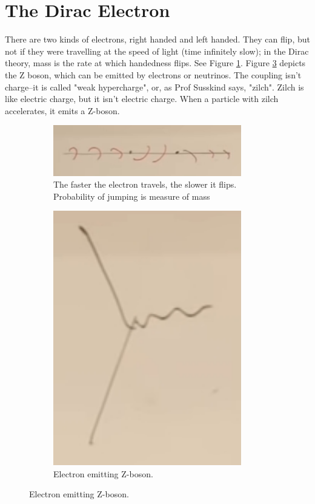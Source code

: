 \documentclass[]{article}
\begin{document}
\section{The Dirac Electron}

There are two kinds of electrons, right handed and left handed. They can flip, but not if they were travelling at the speed of light (time infinitely slow); in the Dirac theory, mass is the rate at which handedness flips. See Figure \ref{fig:2-a3-flipping-electron}. Figure \ref{fig:2-a3-Z-boson} depicts the Z boson, which can be emitted by electrons or neutrinos. The coupling isn't charge--it is called "weak hypercharge", or, as Prof Susskind says, "zilch". Zilch is like electric charge, but it isn't electric charge. When a particle with zilch accelerates, it emits a Z-boson.

\begin{figure}[H]
	\caption{Electron flipping between left and right}
	\begin{subfigure}[t]{0.65\textwidth}
		\caption{The faster the electron travels, the slower it flips. Probability of jumping is measure of mass}\label{fig:2-a3-flipping-electron}
		\includegraphics[width=0.9\textwidth]{2-a3-flipping-electron}
	\end{subfigure}
	\begin{subfigure}[t]{0.3\textwidth}
		\caption{Electron emitting Z-boson. }\label{fig:2-a3-Z-boson}
		\includegraphics[width=0.9\textwidth]{2-a3-Z-boson}

\end{subfigure}
\end{figure}
\end{document}
